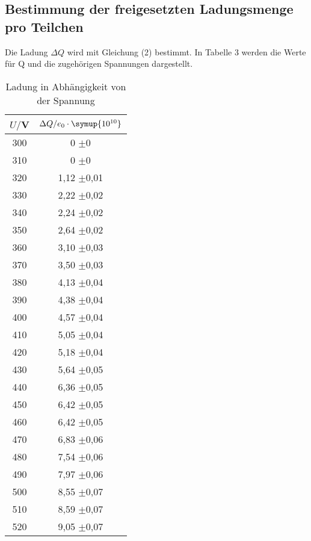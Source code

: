 \subsection{Bestimmung der freigesetzten Ladungsmenge pro Teilchen}

Die Ladung $\Delta Q$ wird mit Gleichung (2) bestimmt. In Tabelle 3 werden die Werte für Q und die zugehörigen Spannungen dargestellt.

\begin{table}[H]
  \centering
  \caption{Ladung in Abhängigkeit von der Spannung}
  \label{tab:Rechteckspannung}
  \begin{tabular}{c c}
    \toprule
    $U/$V & $\Delta Q/e_0 \cdot \symup{10^{10}}$ \\
    \midrule
      300 &                  0   $\pm 0$ \\
      310 &                  0   $\pm 0$ \\
      320 &        1,12    $\pm$0,01 \\
      330 &        2,22    $\pm$0,02 \\
      340 &        2,24    $\pm$0,02 \\
      350 &        2,64    $\pm$0,02 \\
      360 &        3,10    $\pm$0,03 \\
      370 &        3,50    $\pm$0,03 \\
      380 &        4,13    $\pm$0,04 \\
      390 &        4,38    $\pm$0,04 \\
      400 &        4,57    $\pm$0,04 \\
      410 &        5,05    $\pm$0,04 \\
      420 &        5,18    $\pm$0,04 \\
      430 &        5,64    $\pm$0,05 \\
      440 &        6,36    $\pm$0,05 \\
      450 &        6,42    $\pm$0,05 \\
      460 &        6,42    $\pm$0,05 \\
      470 &        6,83    $\pm$0,06 \\
      480 &        7,54    $\pm$0,06 \\
      490 &        7,97    $\pm$0,06 \\
      500 &        8,55    $\pm$0,07 \\
      510 &        8,59    $\pm$0,07 \\
      520 &        9,05    $\pm$0,07 \\

\end{tabular}
\end{table}
